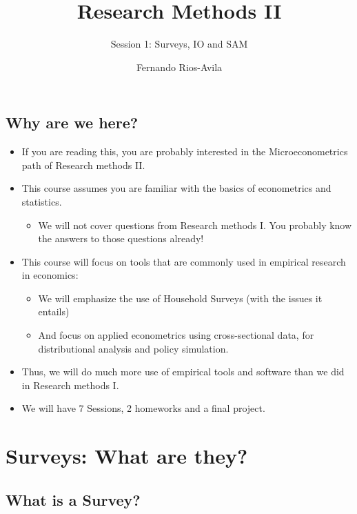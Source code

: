 \documentclass[
  letterpaper,
  DIV=11,
  numbers=noendperiod]{scrartcl}
\title{Research Methods II}
\subtitle{Session 1: Surveys, IO and SAM}
\author{Fernando Rios-Avila}
\date{}
\providecommand{\tightlist}{%
  \setlength{\itemsep}{0pt}\setlength{\parskip}{0pt}}\usepackage{longtable,booktabs,array}
\begin{document}
\maketitle
\subsection{Why are we here?}\label{why-are-we-here}

\begin{itemize}
\item
  If you are reading this, you are probably interested in the
  Microeconometrics path of Research methods II.
\item
  This course assumes you are familiar with the basics of econometrics
  and statistics.

  \begin{itemize}
  \tightlist
  \item
    We will not cover questions from Research methods I. You probably
    know the answers to those questions already!
  \end{itemize}
\item
  This course will focus on tools that are commonly used in empirical
  research in economics:

  \begin{itemize}
  \item
    We will emphasize the use of Household Surveys (with the issues it
    entails)
  \item
    And focus on applied econometrics using cross-sectional data, for
    distributional analysis and policy simulation.
  \end{itemize}
\item
  Thus, we will do much more use of empirical tools and software than we
  did in Research methods I.
\item
  We will have 7 Sessions, 2 homeworks and a final project.
\end{itemize}

\section{Surveys: What are they?}\label{surveys-what-are-they}

\subsection{What is a Survey?}\label{what-is-a-survey}
\end{document}

